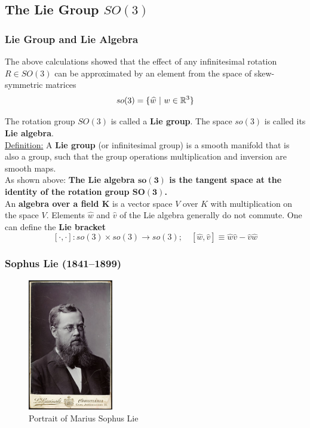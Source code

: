 \subsection{The Lie Group $SO(3)$}%
\label{sub:the_lie_group_so_3_}


\subsubsection{Lie Group and Lie Algebra}%
\label{ssub:lie_group_and_lie_algebra}

The above calculations showed that the effect of any infinitesimal
rotation $R \in SO(3)$ can be approximated by an element from
the space of skew-symmetric matrices
	\[so(3) = \{ \widehat{w}\ |\ w \in \mathbb{R}^3\}\]

The rotation group $SO(3)$ is called a \textbf{Lie group}.
The space $so(3)$ is called its \textbf{Lie algebra}.\\

\underline{Definition:}
A \textbf{Lie group} (or infinitesimal group) is a smooth manifold that
is also a group, such that the group operations multiplication
and inversion are smooth maps.\\

As shown above: \textbf{The Lie algebra $\bm{so(3)}$ is the tangent space
at the identity of the rotation group $\bm{SO(3)}$.}\\

An \textbf{algebra over a field $\bm{K}$} is a vector space $V$ over $K$
with multiplication on the space $V$.
Elements $\widehat{w}$ and $\widehat{v}$ of the Lie algebra
generally do not commute.
One can define the \textbf{Lie bracket}
\[[\cdot,\cdot]: so(3) \times so(3) \rightarrow so(3);\quad
[\widehat{w},\widehat{v}] \equiv \widehat{w}\widehat{v} - \widehat{v}\widehat{w}\]


\subsubsection{Sophus Lie (1841--1899)}%
\label{ssub:sophus_lie_1841_1899_}

\begin{figure}[ht]
\centering
\includegraphics[width=10em]{assets/img/sophus_lie.jpg}
\caption*{Portrait of Marius Sophus Lie}
\end{figure}

